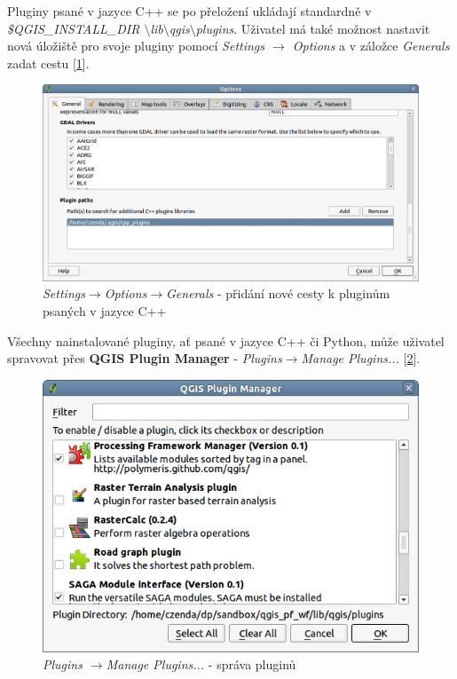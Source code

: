 \noindent Pluginy psané v jazyce C++ se po přeložení ukládají standardně v \textit{\$QGIS\_INSTALL\_DIR $\setminus$lib$\setminus$qgis$\setminus$plugins}. Uživatel má také možnost nastavit nová úložiště pro svoje pluginy pomocí \textit{Settings $\rightarrow$ Options} a v záložce \textit{Generals} zadat cestu [\figurename \ref{cpprepository}]. \\

\begin{figure}[h]
	\centering
	\includegraphics[scale=0.5]{pictures/qgis_plugin/options_cpp_path}
	\caption{\textit{Settings$\rightarrow$Options$\rightarrow$Generals} - přidání nové cesty k pluginům psaných v jazyce C++}
  	\label{cpprepository}
\end{figure}

Všechny nainstalované pluginy, ať psané v jazyce C++ či Python, může uživatel spravovat přes \textbf{QGIS Plugin Manager} - \textit{Plugins$\rightarrow$Manage Plugins...} [\figurename \ref{plugin_manager}].

\begin{figure}[h]
	\centering
	\includegraphics[scale=0.5]{pictures/qgis_plugin/plugin_manager}
	\caption{\textit{Plugins $\rightarrow$Manage Plugins...} - správa pluginů}
  	\label{plugin_manager}
\end{figure}

